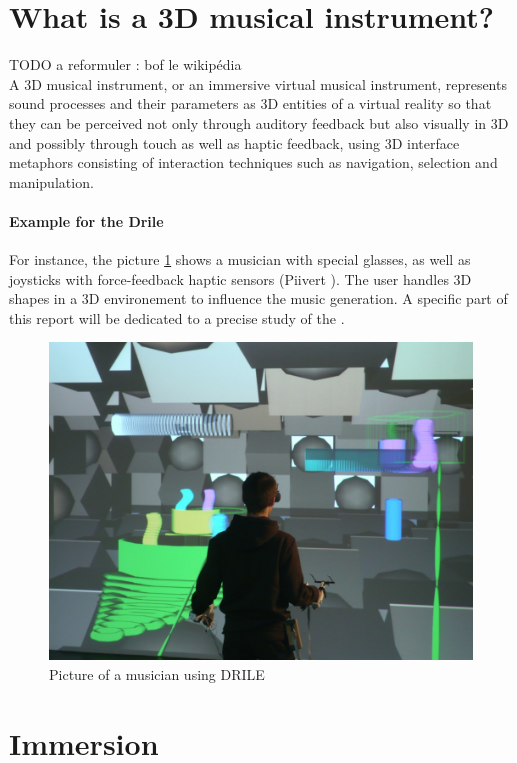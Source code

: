 \newpage
\section{What is a 3D musical instrument?}
{\LARGE{TODO a reformuler : bof le wikipédia}}\\
A 3D musical instrument, or an immersive virtual musical instrument, represents sound processes and their parameters as 3D entities of a virtual reality so that they can be perceived not only through auditory feedback but also visually in 3D and possibly through touch as well as haptic feedback, using 3D interface metaphors consisting of interaction techniques such as navigation, selection and manipulation.

\paragraph{Example for the Drile}
For instance, the picture \ref{drile} shows a musician with special glasses, as well as joysticks with force-feedback haptic sensors (Piivert \cite{berthaut2010piivert}). 
The user handles 3D shapes in a 3D environement to influence the music generation. A specific part of this report will be dedicated to a precise study of the .

\begin{figure}[t]
\centering
\includegraphics[scale=0.3]{image/drile.jpg}
\caption{Picture of a musician using DRILE}
\label{drile}
\end{figure}

\newpage
\section{Immersion}
